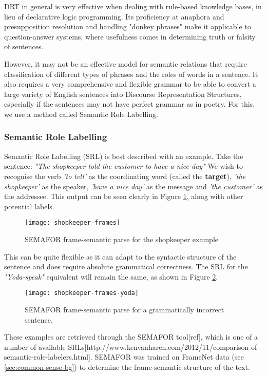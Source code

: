 DRT in general is very effective when dealing with rule-based knowledge bases, in lieu of declarative logic programming. Its proficiency at anaphora and presupposition resolution and handling "donkey phrases" make it applicable to question-answer systems, where usefulness comes in determining truth or falsity of sentences.

However, it may not be an effective model for semantic relations that require classification of different types of phrases and the roles of words in a sentence. It also requires a very comprehensive and flexible grammar to be able to convert a large variety of English sentences into Discourse Representation Structures, especially if the sentences may not have perfect grammar as in poetry. For this, we use a method called Semantic Role Labelling.

\subsubsection{Semantic Role Labelling}
Semantic Role Labelling (SRL) is best described with an example. Take the sentence:
{\centering\textit{"The shopkeeper told the customer to have a nice day"}}
We wish to recognise the verb \textit{'to tell'} as the coordinating word (called the \textbf{target}), \textit{'the shopkeeper'} as the speaker, \textit{'have a nice day'} as the message and \textit{'the customer'} as the addressee. This output can be seen clearly in Figure \ref{fig:shopkeeper-frames}, along with other potential labels. 

\begin{figure}[h!]
\centering
\texttt{[image: shopkeeper-frames]}
\caption{SEMAFOR frame-semantic parse for the shopkeeper example}
\label{fig:shopkeeper-frames}
\end{figure}

This can be quite flexible as it can adapt to the syntactic structure of the sentence and does require absolute grammatical correctness. The SRL for the \textit{"Yoda-speak"} equivalent will remain the same, as shown in Figure \ref{fig:shopkeeper-frames-yoda}.

\begin{figure}[h!]
\centering
\texttt{[image: shopkeeper-frames-yoda]}
\caption{SEMAFOR frame-semantic parse for a grammatically incorrect sentence.}
\label{fig:shopkeeper-frames-yoda}
\end{figure}

These examples are retrieved through the SEMAFOR tool[ref],  which is one of a number of available SRLs[http://www.kenvanharen.com/2012/11/comparison-of-semantic-role-labelers.html]. SEMAFOR was trained on FrameNet data (see \ref{sec:common-sense-bg}) to determine the frame-semantic structure of the text.

